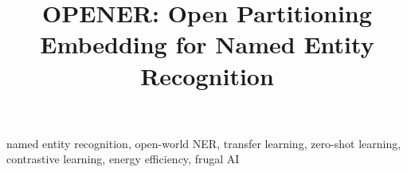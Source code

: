 \documentclass[10pt,conference,onecolumn]{IEEEtran}
\begin{document}
\title{OPENER: Open Partitioning Embedding for Named Entity Recognition}

\author{
}

\maketitle

\begin{abstract}

\end{abstract}

\begin{IEEEkeywords}
named entity recognition, open-world NER, transfer learning, zero-shot learning, contrastive learning, energy efficiency, frugal AI
\end{IEEEkeywords}










\end{document}
